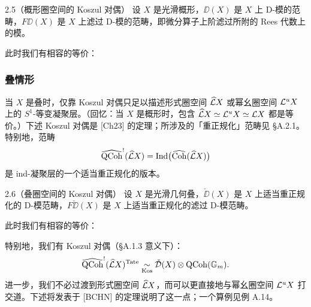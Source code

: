 \begin{thm}{2.5（概形圈空间的 Koszul 对偶）}\label{thm:a5-02-1}
设 $X$ 是光滑概形，$\DD(X)$ 是 $X$ 上 D-模的范畴，$F\DD(X)$ 是 $X$ 上滤过 D-模的范畴，即微分算子上阶滤过所附的 Rees 代数上的模。

此时我们有相容的等价：
\begin{center}
\end{center}
\end{thm}

\subsubsection{叠情形}
当 $X$ 是叠时，仅靠 Koszul 对偶只足以描述形式圈空间 $\widehat{\mathcal{L}} X$ 或幂幺圈空间 $\mathcal{L}^uX$ 上的 $S^1$-等变凝聚层。（回忆：当 $X$ 是概形时，包含 $\widehat{\mathcal{L}} X\simeq\mathcal{L}^uX\simeq\mathcal{L} X$ 都是等价。）下述 Koszul 对偶是 [Ch23] 的定理；所涉及的「重正规化」范畴见 §A.2.1。特别地，范畴
\[
\widehat{\operatorname{QCoh}}^!(\widehat{\mathcal{L}} X)=\operatorname{Ind}\bigl(\widehat{\operatorname{Coh}}(\widehat{\mathcal{L}} X)\bigr)
\]
是 ind-凝聚层的一个适当重正规化的版本。

\begin{thm}{2.6（叠圈空间的 Koszul 对偶）}\label{thm:a5-02-2}
设 $X$ 是光滑几何叠，$\check\DD(X)$ 是 $X$ 上适当重正规化的 D-模范畴，$F\check\DD(X)$ 是 $X$ 上适当重正规化的滤过 D-模范畴。

此时我们有相容的等价：
\begin{center}
\end{center}
\end{thm}

特别地，我们有 Koszul 对偶（§A.1.3 意义下）：
\[
\widehat{\operatorname{QCoh}}^!(\widehat{\mathcal{L}} X)^{\mathrm{Tate}}\underset{\mathrm{Kos}}{\sim}\check{\mathcal{D}}(X)\otimes\operatorname{QCoh}(\mathbb{G}_m).
\]
进一步，我们不必过渡到形式圈空间 $\widehat{\mathcal{L}} X$，而可以更直接地与幂幺圈空间 $\mathcal{L}^uX$ 打交道。下述将发表于 [BCHN] 的定理说明了这一点；一个算例见例 A.14。

